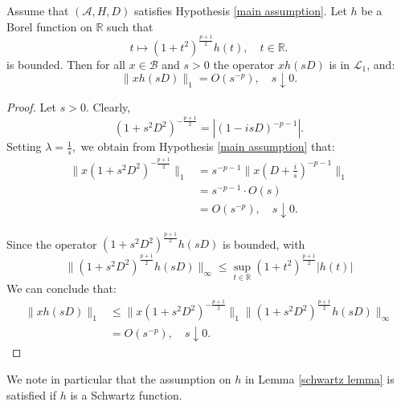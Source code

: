     \begin{lem}\label{schwartz lemma} 
        Assume that $(\mathcal{A},H,D)$ satisfies Hypothesis \ref{main assumption}. Let $h$ be a Borel function on $\mathbb{R}$ such that
        \begin{equation*}
            t \mapsto (1+t^2)^{\frac{p+1}{2}}h(t), \quad t \in \mathbb{R}.
        \end{equation*}
        is bounded.
        Then for all $x \in \mathcal{B}$ and $s > 0$ the operator $xh(sD)$ is in $\mathcal{L}_1$, and:
        \begin{equation*}
            \|xh(sD)\|_1=O(s^{-p}),\quad s\downarrow0.
        \end{equation*}
    \end{lem}
    \begin{proof} 
        Let $s > 0$. Clearly,
        $$(1+s^2D^2)^{-\frac{p+1}{2}}=|(1-isD)^{-p-1}|.$$
        Setting $\lambda=\frac1s,$ we obtain from Hypothesis \ref{main assumption} that:
        \begin{align*}
            \|x(1+s^2D^2)^{-\frac{p+1}{2}}\|_1 &= s^{-p-1}\|x(D+\frac{i}{s})^{-p-1}\|_1\\
                                               &= s^{-p-1}\cdot O(s)\\
                                               &= O(s^{-p}),\quad s\downarrow0.
        \end{align*}

        Since the operator $(1+s^2D^2)^{\frac{p+1}{2}}h(sD)$ is bounded, with
        \begin{equation*}
            \|(1+s^2D^2)^{\frac{p+1}{2}}h(sD)\|_\infty \leq \sup_{t \in \mathbb{R}} (1+t^2)^{\frac{p+1}{2}}|h(t)|
        \end{equation*}
        We can conclude that:
        \begin{align*}
            \|xh(sD)\|_1 &\leq \|x(1+s^2D^2)^{-\frac{p+1}{2}}\|_1\|(1+s^2D^2)^{\frac{p+1}{2}}h(sD)\|_\infty\\
                         &= O(s^{-p}),\quad s\downarrow 0.
        \end{align*}
    \end{proof}
    We note in particular that the assumption on $h$ in Lemma \ref{schwartz lemma} is satisfied if $h$ is a Schwartz function.

